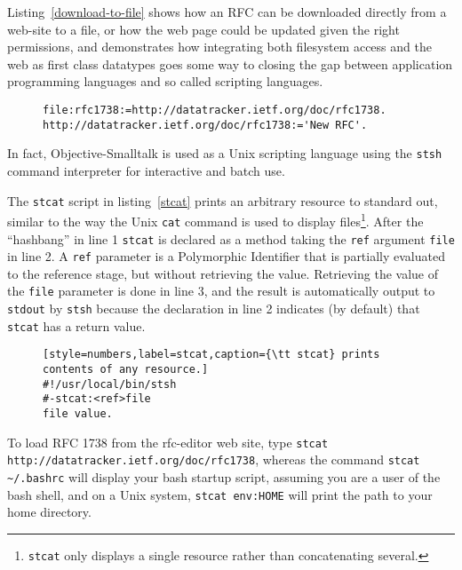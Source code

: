 \documentclass[preprint,authoryear]{llncs}
\begin{document}
Listing~\ref{download-to-file} shows how an RFC can be downloaded directly from a web-site
to a file, or how the web page could be updated given the right permissions, and demonstrates how integrating both filesystem access and the web as first class datatypes
goes some way to closing the gap between application programming languages and so called
scripting languages.

\begin{figure}[htbp]
\begin{lstlisting}[style=numbers,label=download-to-file,caption=Downloading an RFC to a file.]
file:rfc1738:=http://datatracker.ietf.org/doc/rfc1738.
http://datatracker.ietf.org/doc/rfc1738:='New RFC'.
\end{lstlisting}
\end{figure}

In fact,  Objective-Smalltalk is used as a Unix scripting language using the {\tt stsh} command
interpreter for interactive and batch use.  

The {\tt stcat} script in listing~\ref{stcat} prints an arbitrary resource to standard out, 
similar to the way the Unix {\tt cat} command is used to display files\footnote{{\tt stcat} only 
displays a single resource rather than concatenating several.}.
After the ``hashbang'' in line 1 {\tt stcat} is declared as a method taking the {\tt ref} argument {\tt file} 
in line 2.
A {\tt ref} parameter is a Polymorphic Identifier that is partially evaluated to the reference stage,
but without retrieving the value.  Retrieving the value of the {\tt file} parameter is done in line 3,
and the result is automatically output to {\tt stdout} by {\tt stsh} because the declaration in line
2 indicates (by default) that {\tt stcat} has a return value.

\begin{figure}[htbp]
\begin{lstlisting}[style=numbers,label=stcat,caption={\tt stcat} prints contents of any resource.]
#!/usr/local/bin/stsh
#-stcat:<ref>file
file value.
\end{lstlisting}
\end{figure}

To load RFC 1738 from the rfc-editor web site, type  {\tt stcat http://datatracker.ietf.org/doc/rfc1738}, whereas 
the command {\tt stcat \~\//.bashrc} will display your bash startup script, assuming you are a user of the
bash shell, and on a Unix system, {\tt stcat env:HOME} will print the path to 
your home directory.
\end{document}
